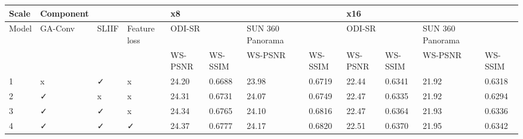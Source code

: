 \begin{tabular}{llllllllllll}
\toprule
Scale & Component &  &  & x8 &  &  &  & x16 &  &  &  \\
\midrule
Model & GA-Conv & SLIIF & Feature loss & ODI-SR &  & SUN 360 Panorama &  & ODI-SR &  & SUN 360 Panorama &  \\
 &  &  &  & WS-PSNR & WS-SSIM & WS-PSNR & WS-SSIM & WS-PSNR & WS-SSIM & WS-PSNR & WS-SSIM \\
1 & x & ✓ & x & 24.20 & 0.6688 & 23.98 & 0.6719 & 22.44 & 0.6341 & 21.92 & 0.6318 \\
2 & ✓ & x & x & 24.31 & 0.6731 & 24.07 & 0.6749 & 22.47 & 0.6335 & 21.92 & 0.6294 \\
3 & ✓ & ✓ & x & 24.34 & 0.6765 & 24.10 & 0.6816 & 22.47 & 0.6364 & 21.93 & 0.6336 \\
4 & ✓ & ✓ & ✓ & 24.37 & 0.6777 & 24.17 & 0.6820 & 22.51 & 0.6370 & 21.95 & 0.6342 \\
\bottomrule
\end{tabular}
